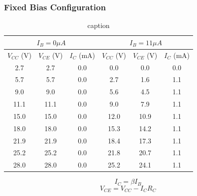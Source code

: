 \documentclass[12pt]{article}
\begin{document}
\subsubsection{Fixed Bias Configuration}
\bgroup
\def\arraystretch{1.5}
\begin{table}[h!]
    \centering
    \begin{tabular}{|c|c|c||c|c|c|}
        \hline
        \multicolumn{3}{|c||}{$I_B = 0 \mu A$} & \multicolumn{3}{|c|}{$I_B = 11 \mu A$} \\
        \hline
        $V_{CC}$ (V) & $V_{CE}$ (V) & $I_C$ (mA) & $V_{CC}$ (V) & $V_{CE}$ (V) & $I_C$ (mA) \\ \hline
        2.7 & 2.7 & 0.0 & 0.0 & 0.0 & 0.0 \\
        5.7 & 5.7 & 0.0 & 2.7 & 1.6 & 1.1 \\
        9.0 & 9.0 & 0.0 & 5.6 & 4.5 & 1.1 \\
        11.1 & 11.1 & 0.0 & 9.0 & 7.9 & 1.1 \\
        15.0 & 15.0 & 0.0 & 12.0 & 10.9 & 1.1 \\
        18.0 & 18.0 & 0.0 & 15.3 & 14.2 & 1.1 \\
        21.9 & 21.9 & 0.0 & 18.4 & 17.3 & 1.1 \\
        25.2 & 25.2 & 0.0 & 21.8 & 20.7 & 1.1 \\
        28.0 & 28.0 & 0.0 & 25.2 & 24.1 & 1.1 \\
        \hline
    \end{tabular}
    \caption{caption}
    \label{Theoretical Fixed Bias}
\end{table}
\egroup
\vspace{-20pt}
\[
    I_C = \beta I_B
\] \[
    V_{CE} = V_{CC} - I_C R_C
\]
\end{document}
